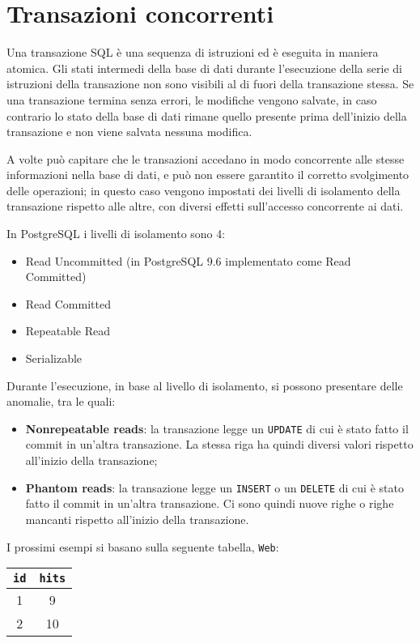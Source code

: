 \documentclass[a4paper, 10pt, titlepage]{article}
\begin{document}
	\newpage
	
		\section{Transazioni concorrenti}
	Una transazione SQL è una sequenza di istruzioni ed è eseguita in maniera atomica.
	Gli stati intermedi della base di dati durante l'esecuzione della serie di istruzioni della transazione non sono visibili al di fuori della transazione stessa.
	Se una transazione termina senza errori, le modifiche vengono salvate, in caso contrario lo stato della base di dati rimane quello presente prima dell'inizio della transazione e non viene salvata nessuna modifica.
	
	A volte può capitare che le transazioni accedano in modo concorrente alle stesse informazioni nella base di dati, e può non essere garantito il corretto svolgimento delle operazioni; in questo caso vengono impostati dei livelli di isolamento della transazione rispetto alle altre, con diversi effetti sull'accesso concorrente ai dati.
	
	In PostgreSQL i livelli di isolamento sono 4:
		\begin{itemize}
			\item Read Uncommitted (in PostgreSQL 9.6 implementato come Read Committed)
			\item Read Committed
			\item Repeatable Read
			\item Serializable	
		\end{itemize}
		Durante l'esecuzione, in base al livello di isolamento, si possono presentare delle anomalie, tra le quali:
		\begin{itemize}
		\item \textbf{Nonrepeatable reads}: la transazione legge un \lstinline|UPDATE| di cui è stato fatto il commit in un'altra transazione. La stessa riga ha quindi diversi valori rispetto all'inizio della transazione;
		\item \textbf{Phantom reads}: la transazione legge un \lstinline|INSERT| o un \lstinline|DELETE| di cui è stato fatto il commit in un'altra transazione. Ci sono quindi nuove righe o righe mancanti rispetto all'inizio della transazione.
		\end{itemize}\medskip
		I prossimi esempi si basano sulla seguente tabella, 
		\lstinline|Web|: \qquad
		\begin{tabular}{cc}
			\toprule
			\lstinline|id| & \lstinline|hits| \\
			\midrule
			1 & 9 \\
			2 & 10 \\
			\midrule
		\end{tabular}
\end{document}
